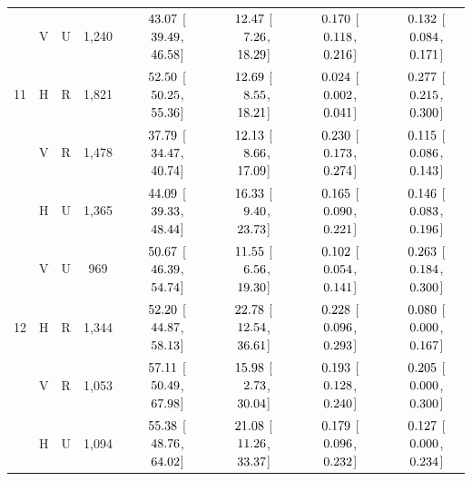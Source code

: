 \begin{landscape}
\begin{longtable}{lccccccc}
 & V & U & 1,240 & $\hphantom{-}43.07$ [$\hphantom{-}39.49$, $\hphantom{-}46.58$] & $\hphantom{-}12.47$ [$\hphantom{-}\hphantom{0}7.26$, $\hphantom{-}18.29$] & $\hphantom{-}0.170$ [$\hphantom{-}0.118$, $\hphantom{-}0.216$] & $\hphantom{-}0.132$ [$\hphantom{-}0.084$, $\hphantom{-}0.171$] \\
11 & H & R & 1,821 & $\hphantom{-}52.50$ [$\hphantom{-}50.25$, $\hphantom{-}55.36$] & $\hphantom{-}12.69$ [$\hphantom{-}\hphantom{0}8.55$, $\hphantom{-}18.21$] & $\hphantom{-}0.024$ [$\hphantom{-}0.002$, $\hphantom{-}0.041$] & $\hphantom{-}0.277$ [$\hphantom{-}0.215$, $\hphantom{-}0.300$] \\
 & V & R & 1,478 & $\hphantom{-}37.79$ [$\hphantom{-}34.47$, $\hphantom{-}40.74$] & $\hphantom{-}12.13$ [$\hphantom{-}\hphantom{0}8.66$, $\hphantom{-}17.09$] & $\hphantom{-}0.230$ [$\hphantom{-}0.173$, $\hphantom{-}0.274$] & $\hphantom{-}0.115$ [$\hphantom{-}0.086$, $\hphantom{-}0.143$] \\
 & H & U & 1,365 & $\hphantom{-}44.09$ [$\hphantom{-}39.33$, $\hphantom{-}48.44$] & $\hphantom{-}16.33$ [$\hphantom{-}\hphantom{0}9.40$, $\hphantom{-}23.73$] & $\hphantom{-}0.165$ [$\hphantom{-}0.090$, $\hphantom{-}0.221$] & $\hphantom{-}0.146$ [$\hphantom{-}0.083$, $\hphantom{-}0.196$] \\
 & V & U & 969 & $\hphantom{-}50.67$ [$\hphantom{-}46.39$, $\hphantom{-}54.74$] & $\hphantom{-}11.55$ [$\hphantom{-}\hphantom{0}6.56$, $\hphantom{-}19.30$] & $\hphantom{-}0.102$ [$\hphantom{-}0.054$, $\hphantom{-}0.141$] & $\hphantom{-}0.263$ [$\hphantom{-}0.184$, $\hphantom{-}0.300$] \\
12 & H & R & 1,344 & $\hphantom{-}52.20$ [$\hphantom{-}44.87$, $\hphantom{-}58.13$] & $\hphantom{-}22.78$ [$\hphantom{-}12.54$, $\hphantom{-}36.61$] & $\hphantom{-}0.228$ [$\hphantom{-}0.096$, $\hphantom{-}0.293$] & $\hphantom{-}0.080$ [$\hphantom{-}0.000$, $\hphantom{-}0.167$] \\
 & V & R & 1,053 & $\hphantom{-}57.11$ [$\hphantom{-}50.49$, $\hphantom{-}67.98$] & $\hphantom{-}15.98$ [$\hphantom{-}\hphantom{0}2.73$, $\hphantom{-}30.04$] & $\hphantom{-}0.193$ [$\hphantom{-}0.128$, $\hphantom{-}0.240$] & $\hphantom{-}0.205$ [$\hphantom{-}0.000$, $\hphantom{-}0.300$] \\
 & H & U & 1,094 & $\hphantom{-}55.38$ [$\hphantom{-}48.76$, $\hphantom{-}64.02$] & $\hphantom{-}21.08$ [$\hphantom{-}11.26$, $\hphantom{-}33.37$] & $\hphantom{-}0.179$ [$\hphantom{-}0.096$, $\hphantom{-}0.232$] & $\hphantom{-}0.127$ [$\hphantom{-}0.000$, $\hphantom{-}0.234$] \\

\end{longtable}
\end{landscape}
